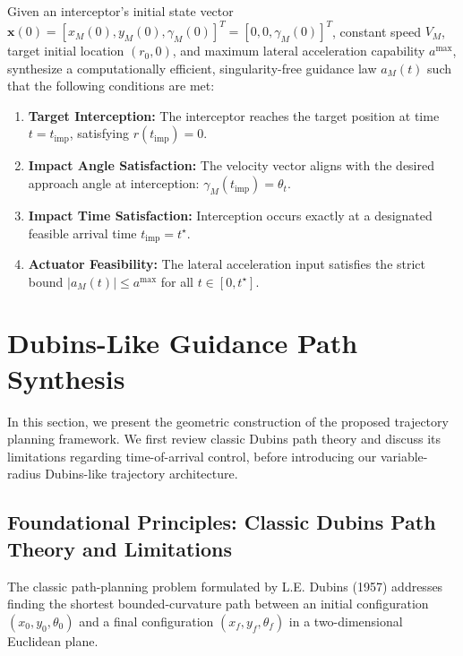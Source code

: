 \begin{problem}\label{prob:ch_DP_main_problem}
Given an interceptor's initial state vector $\mathbf{x}(0) = [x_M(0), y_M(0), \gamma_M(0)]^T = [0, 0, \gamma_M(0)]^T$, constant speed $V_M$, target initial location $(r_0, 0)$, and maximum lateral acceleration capability $a^{\max}$, synthesize a computationally efficient, singularity-free guidance law $a_M(t)$ such that the following conditions are met:
\begin{enumerate}
    \item \textbf{Target Interception:} The interceptor reaches the target position at time $t = t_{\text{imp}}$, satisfying $r(t_{\text{imp}}) = 0$.
    \item \textbf{Impact Angle Satisfaction:} The velocity vector aligns with the desired approach angle at interception: $\gamma_M(t_{\text{imp}}) = \theta_t$.
    \item \textbf{Impact Time Satisfaction:} Interception occurs exactly at a designated feasible arrival time $t_{\text{imp}} = t^{\star}$.
    \item \textbf{Actuator Feasibility:} The lateral acceleration input satisfies the strict bound $|a_M(t)| \le a^{\max}$ for all $t \in [0, t^{\star}]$.
\end{enumerate}
\end{problem}

\section{Dubins-Like Guidance Path Synthesis}\label{sec:ch_DP_main_design}

In this section, we present the geometric construction of the proposed trajectory planning framework. We first review classic Dubins path theory and discuss its limitations regarding time-of-arrival control, before introducing our variable-radius Dubins-like trajectory architecture.
\subsection{Foundational Principles: Classic Dubins Path Theory and Limitations}\label{subsec:ch_DP_dubins_theory}

The classic path-planning problem formulated by L.E. Dubins (1957) addresses finding the shortest bounded-curvature path between an initial configuration $(x_0, y_0, \theta_0)$ and a final configuration $(x_f, y_f, \theta_f)$ in a two-dimensional Euclidean plane. 

